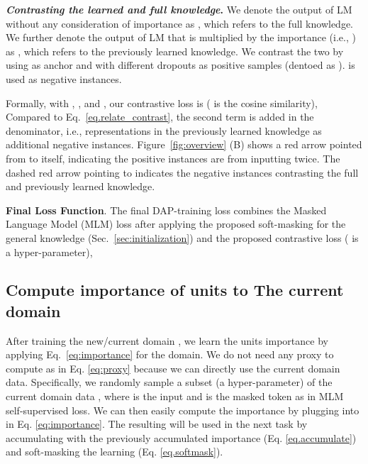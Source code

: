 \documentclass{article} \usepackage{iclr2023_conference,times}
\begin{document}
{\color{black}\textbf{\textit{Contrasting the learned and full knowledge}.} We denote the output of LM without any consideration of importance as , which refers to the full knowledge. We further denote the output of LM that is multiplied by the importance (i.e., ) as , which refers to the previously learned knowledge. We contrast the two by using  as anchor and  with different dropouts as positive samples (dentoed as ).   is used as negative instances. 









Formally, with , , and , our contrastive loss is ( is the cosine similarity), {\color{black}\vspace{-1mm}
}
Compared to Eq.~\ref{eq.relate_contrast},
the second term is added in the denominator, i.e., representations in the previously learned knowledge as additional negative instances. Figure~\ref{fig:overview} (B) shows a red arrow pointed from  to itself, indicating the positive instances are from inputting twice. The dashed red arrow pointing to  indicates the negative instances contrasting the full and previously learned knowledge.
}




\noindent
\textbf{Final Loss Function}.
The final DAP-training loss combines the Masked Language Model (MLM) loss after applying the proposed soft-masking for the general knowledge 
(Sec.~\ref{sec:initialization}) and the proposed contrastive loss ({\color{black} is a hyper-parameter}),

\subsection{Compute importance of units to The current domain}
\label{sec:after_training}
\vspace{-1mm}
After training the new/current domain , we learn the units importance by applying Eq.~\ref{eq:importance} for the domain. We do not need any proxy to compute   as in Eq. \ref{eq:proxy} because we can directly use the current domain data. Specifically, we randomly sample a subset (a hyper-parameter) of the current domain data , where  is the input and  is the masked token as in MLM self-supervised loss. We can then easily compute the importance  by plugging  into  in Eq. \ref{eq:importance}. The resulting  will be used in the next task by accumulating with the previously accumulated importance (Eq. \ref{eq.accumulate}) and soft-masking the learning (Eq. \ref{eq.softmask}). 
\end{document}
